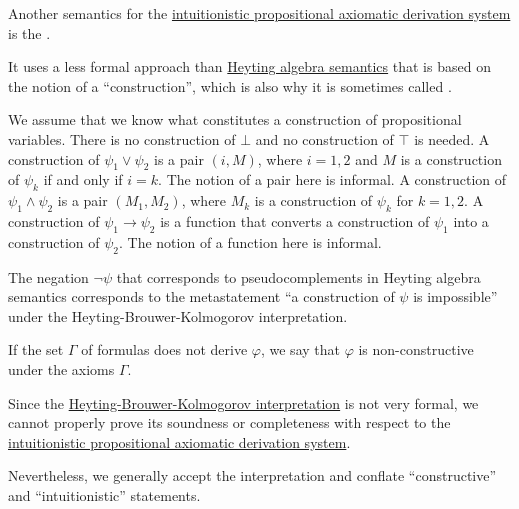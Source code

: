 \begin{definition}\label{def:brouwer_heyting_kolmogorov_interpretation}
  Another semantics for the \hyperref[def:intuitionistic_propositional_axiomatic_derivation_system]{intuitionistic propositional axiomatic derivation system} is the .

  It uses a less formal approach than \hyperref[def:propositional_heyting_algebra_semantics]{Heyting algebra semantics} that is based on the notion of a \enquote{construction}, which is also why it is sometimes called .

  \begin{thmenum}
     We assume that we know what constitutes a construction of propositional variables.
     There is no construction of \( \bot \) and no construction of \( \top \) is needed.
     A construction of \( \psi_1 \vee \psi_2 \) is a pair \( (i, M) \), where \( i = 1, 2 \) and \( M \) is a construction of \( \psi_k \) if and only if \( i = k \). The notion of a pair here is informal.
     A construction of \( \psi_1 \wedge \psi_2 \) is a pair \( (M_1, M_2) \), where \( M_k \) is a construction of \( \psi_k \) for \( k = 1, 2 \).
     A construction of \( \psi_1 \rightarrow \psi_2 \) is a function that converts a construction of \( \psi_1 \) into a construction of \( \psi_2 \). The notion of a function here is informal.
  \end{thmenum}

  The negation \( \neg\psi \) that corresponds to pseudocomplements in Heyting algebra semantics corresponds to the metastatement \enquote{a construction of \( \psi \) is impossible} under the Heyting-Brouwer-Kolmogorov interpretation.

  If the set \( \Gamma \) of formulas does not derive \( \varphi \), we say that \( \varphi \) is non-constructive under the axioms \( \Gamma \).
\end{definition}

\begin{remark}\label{rem:brouwer_heyting_kolmogorov_interpretation_compatibility}
  Since the \hyperref[def:brouwer_heyting_kolmogorov_interpretation]{Heyting-Brouwer-Kolmogorov interpretation} is not very formal, we cannot properly prove its soundness or completeness with respect to the \hyperref[def:intuitionistic_propositional_axiomatic_derivation_system]{intuitionistic propositional axiomatic derivation system}.

  Nevertheless, we generally accept the interpretation and conflate \enquote{constructive} and \enquote{intuitionistic} statements.
\end{remark}

